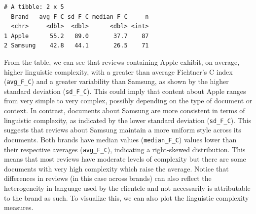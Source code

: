 \begin{verbatim}
# A tibble: 2 x 5
  Brand   avg_F_C sd_F_C median_F_C     n
  <chr>     <dbl>  <dbl>      <dbl> <int>
1 Apple      55.2   89.0       37.7    87
2 Samsung    42.8   44.1       26.5    71
\end{verbatim}

From the table, we can see that reviews containing Apple
exhibit, on average, higher linguistic complexity, with a greater
than average Fichtner's C index (\texttt{avg\_F\_C}) and a greater
variability than Samsung, as shown by the higher standard deviation
(\texttt{sd\_F\_C}). This could imply that content about Apple ranges
from very simple to very complex, possibly depending on the type of
document or context. In contrast, documents about Samsung are more
consistent in terms of linguistic complexity, as indicated by the lower
standard deviation (\texttt{sd\_F\_C}). This suggests that reviews about
Samsung maintain a more uniform style across its documents. Both brands
have median values (\texttt{median\_F\_C}) values lower than their
respective averages (\texttt{avg\_F\_C}), indicating a right-skewed
distribution. This means that most reviews have moderate levels of complexity but
there are some documents with very high complexity which raise the
average. Notice that differences in reviews (in this case across brands)
can also reflect the heterogeneity in language used by the
clientele and not necessarily is attributable to the brand as such. To
visualize this, we can also plot the linguistic complexity measures.

\begin{Shaded}
\begin{Highlighting}[]
\NormalTok{(}\SpecialCharTok{+}
  \NormalTok{(} \NormalTok{) }\SpecialCharTok{+}
  \NormalTok{(} \NormalTok{,}
        \NormalTok{,}
        \NormalTok{) }\SpecialCharTok{+}
  \NormalTok{() }\SpecialCharTok{+}
  \NormalTok{(} \NormalTok{(} \OtherTok{=} \NormalTok{, } \OtherTok{=} \NormalTok{)) }\SpecialCharTok{+}
  \NormalTok{(} \NormalTok{())}
\end{Highlighting}
\end{Shaded}

